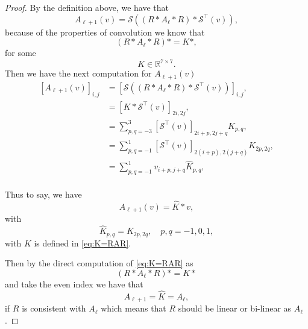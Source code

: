 \begin{proof}
By the definition above, we have that
\begin{equation}
A_{\ell+1} (v) = \mathcal S\left( (R\ast A_{\ell} \ast R )\ast \mathcal S^\top(v) \right),
\end{equation}
because of the properties of convolution we know that 
\begin{equation}\label{eq:K=RAR}
(R\ast A_{\ell} \ast R )\ast = K \ast,
\end{equation}
for some 
$$
K \in \mathbb{R}^{7\times 7}.
$$
Then we have the next computation for $A_{\ell+1}(v)$
\begin{equation}\label{eq:compute_A}
\begin{aligned}
[A_{\ell+1} (v)]_{i,j} &= [\mathcal S\left( (R\ast A_{\ell} \ast R )\ast \mathcal S^\top(v) \right)]_{i,j}, \\
&= [ K\ast  \mathcal S^\top(v)]_{2i,2j}, \\
&= \sum_{p,q=-3}^{3} [\mathcal S^\top (v)]_{2i+p, 2j+q} K_{p,q}, \\
&= \sum_{p,q=-1}^1  [\mathcal S^\top (v)]_{2(i+p), 2(j+q)} K_{2p,2q}, \\
&= \sum_{p,q=-1}^1  v_{i+p, j+q} \hat K_{p,q}, \\
\end{aligned}
\end{equation}
	
Thus to say, we have
\begin{equation}
A_{\ell+1}(v) =  \hat K \ast v,
\end{equation}
with 
$$
\hat K_{p,q} = K_{2p,2q}, \quad p,q = -1,0,1,
$$
with $K$ is defined in \eqref{eq:K=RAR}.

Then by the direct computation of \eqref{eq:K=RAR} as 
$$
(R\ast A_{\ell} \ast R )\ast = K \ast
$$
and take the even index we have that
\begin{equation}
A_{\ell+1} = \hat K = A_\ell,
\end{equation}
if $R$ is consistent with $A_\ell$ which means that $R$ should be linear or bi-linear as $A_\ell$.	
\end{proof}


